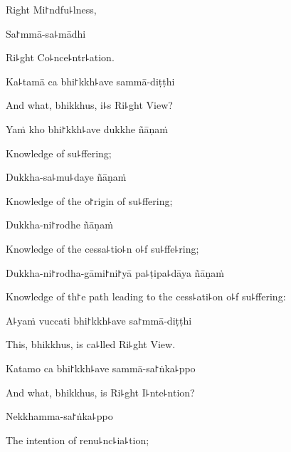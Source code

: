 \begin{english}
  Right Mi꜓ndfu꜕lness,
\end{english}

Sa꜓mmā-sa꜕mādhi

\begin{english}
  Ri꜕ght Co꜕nce꜕ntr꜕ation.
\end{english}

Ka꜕tamā ca bhi꜓kkh꜕ave sammā-diṭṭhi

\begin{english}
  And what, bhikkhus, i꜕s Ri꜕ght View?
\end{english}

Yaṁ kho bhi꜓kkh꜕ave dukkhe ñāṇaṁ

\begin{english}
  Knowledge of su꜕ffering;
\end{english}

Dukkha-sa꜕mu꜕daye ñāṇaṁ

\begin{english}
  Knowledge of the o꜓rigin of su꜕ffering;
\end{english}

Dukkha-ni꜓rodhe ñāṇaṁ

\begin{english}
  Knowledge of the cessa꜕tio꜕n o꜕f su꜕ffe꜕ring;
\end{english}

Dukkha-ni꜓rodha-gāmi꜓ni꜓yā pa꜕ṭipa꜕dāya ñāṇaṁ

\begin{english}
  Knowledge of th꜓e path leading to the cess꜕ati꜕on o꜕f su꜕ffering:
\end{english}

A꜕yaṁ vuccati bhi꜓kkh꜕ave sa꜓mmā-diṭṭhi

\begin{english}
  This, bhikkhus, is ca꜕lled Ri꜕ght View.
\end{english}

Katamo ca bhi꜓kkh꜕ave sammā-sa꜓ṅka꜕ppo

\begin{english}
  And what, bhikkhus, is Ri꜕ght I꜕nte꜕ntion?
\end{english}

\ifaivedition
\clearpage
\fi

Nekkhamma-sa꜓ṅka꜕ppo

\begin{english}
  The intention of renu꜕nc꜕ia꜕tion;
\end{english}


